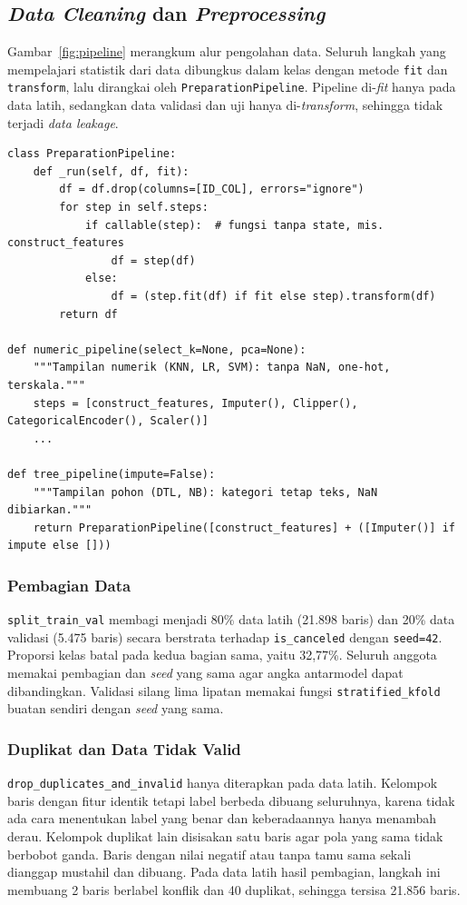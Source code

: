 \subsection{\textit{Data Cleaning} dan \textit{Preprocessing}}\label{sec:preprocessing}
Gambar~\ref{fig:pipeline} merangkum alur pengolahan data. Seluruh langkah yang mempelajari statistik dari data dibungkus dalam kelas dengan metode \texttt{fit} dan \texttt{transform}, lalu dirangkai oleh \texttt{PreparationPipeline}. Pipeline di-\textit{fit} hanya pada data latih, sedangkan data validasi dan uji hanya di-\textit{transform}, sehingga tidak terjadi \textit{data leakage}.

\begin{lstlisting}[emph={PreparationPipeline,numeric_pipeline,tree_pipeline},caption={Pipeline dan dua tampilan data (\texttt{src/preprocessing.py})},label={lst:pipeline}]
class PreparationPipeline:
    def _run(self, df, fit):
        df = df.drop(columns=[ID_COL], errors="ignore")
        for step in self.steps:
            if callable(step):  # fungsi tanpa state, mis. construct_features
                df = step(df)
            else:
                df = (step.fit(df) if fit else step).transform(df)
        return df

def numeric_pipeline(select_k=None, pca=None):
    """Tampilan numerik (KNN, LR, SVM): tanpa NaN, one-hot, terskala."""
    steps = [construct_features, Imputer(), Clipper(), CategoricalEncoder(), Scaler()]
    ...

def tree_pipeline(impute=False):
    """Tampilan pohon (DTL, NB): kategori tetap teks, NaN dibiarkan."""
    return PreparationPipeline([construct_features] + ([Imputer()] if impute else []))
\end{lstlisting}

\subsubsection{Pembagian Data}
\texttt{split\_train\_val} membagi  menjadi 80\% data latih (21.898 baris) dan 20\% data validasi (5.475 baris) secara berstrata terhadap \texttt{is\_canceled} dengan \texttt{seed=42}. Proporsi kelas batal pada kedua bagian sama, yaitu 32,77\%. Seluruh anggota memakai pembagian dan \textit{seed} yang sama agar angka antarmodel dapat dibandingkan. Validasi silang lima lipatan memakai fungsi \texttt{stratified\_kfold} buatan sendiri dengan \textit{seed} yang sama.

\subsubsection{Duplikat dan Data Tidak Valid}
\texttt{drop\_duplicates\_and\_invalid} hanya diterapkan pada data latih. Kelompok baris dengan fitur identik tetapi label berbeda dibuang seluruhnya, karena tidak ada cara menentukan label yang benar dan keberadaannya hanya menambah derau. Kelompok duplikat lain disisakan satu baris agar pola yang sama tidak berbobot ganda. Baris dengan nilai negatif atau tanpa tamu sama sekali dianggap mustahil dan dibuang. Pada data latih hasil pembagian, langkah ini membuang 2 baris berlabel konflik dan 40 duplikat, sehingga tersisa 21.856 baris.


